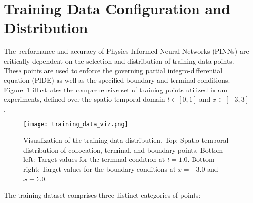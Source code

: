 \documentclass[11pt,twoside,openright]{report}
\begin{document}

\section{Training Data Configuration and Distribution}
\label{sec:training_data}

The performance and accuracy of Physics-Informed Neural Networks (PINNs) are critically dependent on the selection and distribution of training data points. These points are used to enforce the governing partial integro-differential equation (PIDE) as well as the specified boundary and terminal conditions. Figure~\ref{fig:training_data_viz} illustrates the comprehensive set of training points utilized in our experiments, defined over the spatio-temporal domain $t \in [0, 1]$ and $x \in [-3, 3]$.

\begin{figure}[htbp]
    \centering
    \texttt{[image: training\_data\_viz.png]} %
    \caption{Visualization of the training data distribution. Top: Spatio-temporal distribution of collocation, terminal, and boundary points. Bottom-left: Target values for the terminal condition at $t=1.0$. Bottom-right: Target values for the boundary conditions at $x=-3.0$ and $x=3.0$.}
    \label{fig:training_data_viz}
\end{figure}

The training dataset comprises three distinct categories of points:
\end{document}
